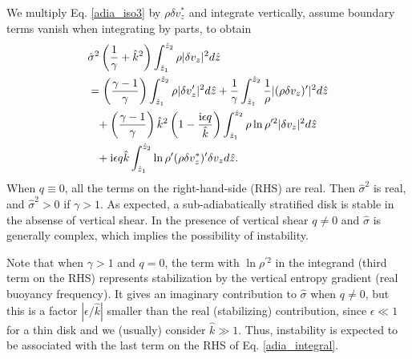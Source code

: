 We multiply Eq. \ref{adia_iso3} by $\rho\delta v_z^*$ and
integrate vertically, assume boundary terms vanish when integrating by
parts, to obtain
\begin{align}
  &\hat{\sigma}^2\left(\frac{1}{\gamma} +
    \hat{k}^2\right)\int_{\hat{z}_1}^{\hat{z}_2}\rho|\delta
  v_z|^2 d\hat{z} \notag\\
  &=  \left(\frac{\gamma-1}{\gamma}\right)
  \int_{\hat{z}_1}^{\hat{z}_2}\rho|\delta v_z^\prime|^2 d\hat{z}
  +\frac{1}{\gamma}\int_{\hat{z}_1}^{\hat{z}_2}\frac{1}{\rho}|(\rho\delta
  v_z)^\prime|^2 d\hat{z}\notag\\
  &\phantom{=} +
  \left(\frac{\gamma-1}{\gamma}\right)\hat{k}^2\left(1-\frac{\mathrm{i}\epsilon
      q}{\hat{k}}\right) \int_{\hat{z}_1}^{\hat{z}_2}\rho\ln\rho^{\prime
    2}|\delta v_z|^2 d\hat{z}\notag\\
  &\phantom{=} + \mathrm{i}\epsilon q \hat{k}
  \int_{\hat{z}_1}^{\hat{z}_2}\ln\rho^\prime(\rho\delta v_z^*)^\prime
  \delta v_z d\hat{z}.\label{adia_integral}
\end{align}
When $q\equiv0$, all the terms on the right-hand-side (RHS) are real. Then
$\hat{\sigma}^2$ is real, and  $\hat{\sigma}^2>0$ if $\gamma>1$. As
expected, a sub-adiabatically stratified disk is stable in the absense
of vertical shear. In the presence of vertical shear $q\neq0$ and
$\hat{\sigma}$ is generally complex, which implies the possibility of
instability.  

Note that when $\gamma>1$ and $q=0$, the term with $\ln\rho^{\prime
  2}$ in the integrand (third term on the RHS) represents
stabilization by the vertical entropy gradient (real buoyancy frequency). 
It gives an imaginary contribution to $\hat{\sigma}$ when $q\neq0$,
but this is a factor $|\epsilon/\hat{k}|$ smaller than the real
(stabilizing) contribution, 
since $\epsilon\ll 1$ for a thin disk and we (usually) consider
$\hat{k}\gg1$. Thus, instability is expected to be associated with the 
last term on the RHS of Eq. \ref{adia_integral}. 

